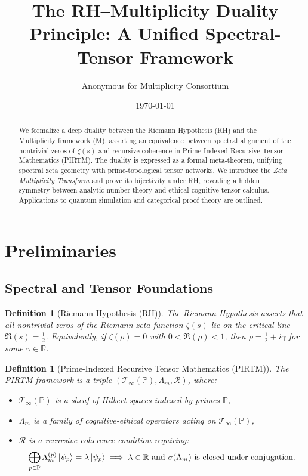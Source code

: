 \documentclass[12pt]{article}
\title{\textbf{The RH--Multiplicity Duality Principle: A Unified Spectral-Tensor Framework}}
\author{Anonymous for Multiplicity Consortium}
\date{\today}
\newtheorem{definition}[theorem]{Definition}
\begin{document}
\maketitle

\begin{abstract}
We formalize a deep duality between the Riemann Hypothesis (RH) and the Multiplicity framework (M), asserting an equivalence between spectral alignment of the nontrivial zeros of $\zeta(s)$ and recursive coherence in Prime-Indexed Recursive Tensor Mathematics (PIRTM). The duality is expressed as a formal meta-theorem, unifying spectral zeta geometry with prime-topological tensor networks. We introduce the \textit{Zeta--Multiplicity Transform} and prove its bijectivity under RH, revealing a hidden symmetry between analytic number theory and ethical-cognitive tensor calculus. Applications to quantum simulation and categorical proof theory are outlined.
\end{abstract}

\section{Preliminaries}

\subsection{Spectral and Tensor Foundations}

\begin{definition}[Riemann Hypothesis (RH)]
The Riemann Hypothesis asserts that all nontrivial zeros of the Riemann zeta function \(\zeta(s)\) lie on the critical line \(\Re(s) = \frac{1}{2}\). Equivalently, if \(\zeta(\rho) = 0\) with \(0 < \Re(\rho) < 1\), then \(\rho = \frac{1}{2} + i\gamma\) for some \(\gamma \in \mathbb{R}\).
\end{definition}

\begin{definition}[Prime-Indexed Recursive Tensor Mathematics (PIRTM)]
The PIRTM framework is a triple \((\mathcal{T}_\infty(\mathbb{P}), \Lambda_m, \mathscr{R})\), where:
\begin{itemize}
    \item \(\mathcal{T}_\infty(\mathbb{P})\) is a sheaf of Hilbert spaces indexed by primes \(\mathbb{P}\),
    \item \(\Lambda_m\) is a family of cognitive-ethical operators acting on \(\mathcal{T}_\infty(\mathbb{P})\),
    \item \(\mathscr{R}\) is a recursive coherence condition requiring:
    \[
    \bigoplus_{p \in \mathbb{P}} \Lambda_m^{(p)} \ket{\psi_p} = \lambda \ket{\psi_p} \implies \lambda \in \mathbb{R} \text{ and } \sigma(\Lambda_m) \text{ is closed under conjugation.}
    \]
\end{itemize}
\end{definition}
\end{document}
